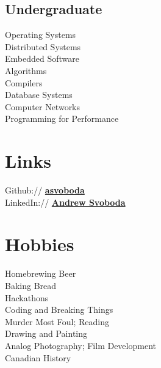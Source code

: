 \documentclass[letterpaper]{deedy-resume} %
\begin{document}
\begin{minipage}[t]{0.33\textwidth}
\subsection{Undergraduate}

Operating Systems \\
Distributed Systems \\
Embedded Software \\
Algorithms \\
Compilers \\
Database Systems \\
Computer Networks \\
Programming for Performance 


\section{Links} 

Github:// \href{https://github.com/asvoboda}{\bf asvoboda} \\
LinkedIn:// \href{https://ca.linkedin.com/pub/andrew-svoboda/80/645/667}{\bf Andrew Svoboda}


\section{Hobbies}

Homebrewing Beer \\
Baking Bread \\
Hackathons \\
Coding and Breaking Things \\
Murder Most Foul; Reading \\
Drawing and Painting \\
Analog Photography; Film Development \\
Canadian History

\sectionspace %


\end{minipage} %
\hfill
%
\end{document}
